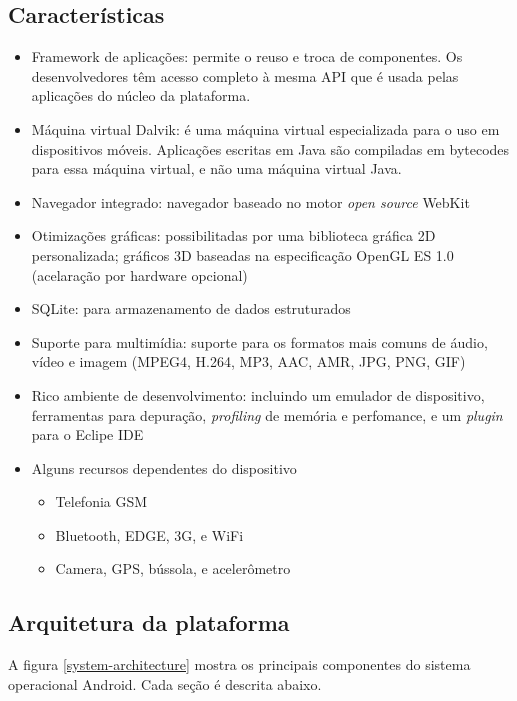 \documentclass[a4paper,12pt]{report}
\begin{document}
\subsection{Características}
\begin{itemize}
    \item Framework de aplicações: permite o reuso e troca de componentes.
    Os desenvolvedores têm acesso completo à mesma API que é usada pelas aplicações
    do núcleo da plataforma.
    \item Máquina virtual Dalvik: é uma máquina virtual especializada para o uso em
    dispositivos móveis. Aplicações escritas em Java são compiladas em bytecodes para
    essa máquina virtual, e não uma máquina virtual Java.
    \item Navegador integrado: navegador baseado no motor {\it open source} WebKit
    \item Otimizações gráficas: possibilitadas por uma biblioteca gráfica 2D 
    personalizada; gráficos 3D baseadas na especificação OpenGL ES 1.0 (acelaração
    por hardware opcional)
    \item SQLite: para armazenamento de dados estruturados
    \item Suporte para multimídia: suporte para os formatos mais comuns de 
    áudio, vídeo e imagem (MPEG4, H.264, MP3, AAC, AMR, JPG, PNG, GIF)
    \item Rico ambiente de desenvolvimento: incluindo um emulador de dispositivo,
    ferramentas para depuração, {\it profiling} de memória e perfomance, e um {\it plugin}
    para o Eclipe IDE
    \item Alguns recursos dependentes do dispositivo
        \begin{itemize}
            \item Telefonia GSM 
            \item Bluetooth, EDGE, 3G, e WiFi
            \item Camera, GPS, bússola, e acelerômetro
        \end{itemize}
\end{itemize}

\subsection{Arquitetura da plataforma}

A figura \ref{system-architecture} mostra os principais componentes do sistema 
operacional Android. Cada seção é descrita abaixo.
\end{document}

